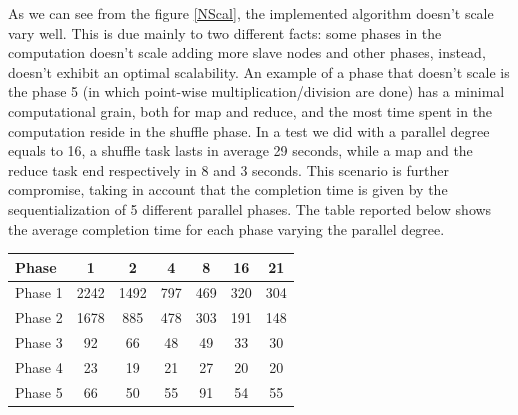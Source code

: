 As we can see from the figure \ref{NScal}, the implemented algorithm doesn't scale vary well. This is due mainly to two different facts: some phases in the computation doesn't scale adding more slave nodes and other phases, instead, doesn't exhibit an optimal scalability. An example of a phase that doesn't scale is the phase 5 (in which point-wise multiplication/division are done) has a minimal computational grain, both for map and reduce, and the most time spent in the computation reside in the shuffle phase. In a test we did with a parallel degree equals to 16, a shuffle task lasts in average 29 seconds, while a map and the reduce task end respectively in 8 and 3 seconds. This scenario is further compromise, taking in account that the completion time is given by the sequentialization of 5 different parallel phases. %
The table reported below shows the average completion time for each phase varying the parallel degree.

\begin{center}
\begin{tabular}{ | l || c | c | c | c |  c | c | }
  \hline      
  Phase & 1 & 2 & 4 & 8 &16 & 21 \\
  \hline      
  Phase 1 & 2242 & 1492 & 797 & 469 & 320 & 304\\
  Phase 2 & 1678 & 885 & 478 & 303 & 191 & 148\\
  Phase 3 & 92 & 66 & 48 & 49 & 33 & 30\\ 
  Phase 4 & 23 & 19 & 21 & 27 & 20 & 20\\
  Phase 5 & 66 & 50 & 55 & 91 & 54 & 55\\
  \hline  
\end{tabular} 
\end{center}





